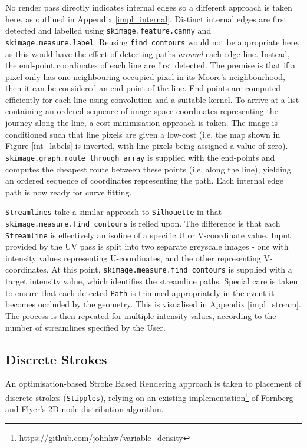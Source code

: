 {No render pass directly indicates internal edges so a different approach is taken here, as outlined in Appendix \ref{impl_internal}.
Distinct internal edges are first detected and labelled using \texttt{skimage.feature.canny} and \texttt{skimage.measure.label}. Reusing \texttt{find\_contours} would not be appropriate here, as this would have the effect of detecting paths \emph{around} each edge line.
Instead, the end-point coordinates of each line are first detected.
The premise is that if a pixel only has one neighbouring occupied pixel in its Moore's neighbourhood, then it can be considered an end-point of the line.
End-points are computed efficiently for each line using convolution and a suitable kernel.
To arrive at a list containing an ordered sequence of image-space coordinates representing the journey along the line, a cost-minimisation approach is taken.
The image is conditioned such that line pixels are given a low-cost (i.e. the map shown in Figure \ref{int_labels} is inverted, with line pixels being assigned a value of zero).
\texttt{skimage.graph.route\_through\_array} is supplied with the end-points and computes the cheapest route between these points (i.e. along the line), yielding an ordered sequence of coordinates representing the path.
Each internal edge path is now ready for curve fitting.

\texttt{Streamlines} take a similar approach to \texttt{Silhouette} in that \texttt{skimage.measure.find\_contours} is relied upon.
The difference is that each \texttt{Streamline} is effectively an isoline of a specific U or V-coordinate value.
Input provided by the UV pass is split into two separate greyscale images - one with intensity values representing U-coordinates, and the other representing V-coordinates.
At this point, \texttt{skimage.measure.find\_contours} is supplied with a target intensity value, which identifies the streamline paths.
Special care is taken to ensure that each detected \texttt{Path} is trimmed appropriately in the event it becomes occluded by the geometry.
This is visualised in Appendix \ref{impl_stream}.
The process is then repeated for multiple intensity values, according to the number of streamlines specified by the User.

\subsection{Discrete Strokes}

An optimisation-based Stroke Based Rendering approach is taken to placement of discrete strokes (\texttt{Stipples}), relying on an existing implementation\footnote{\url{https://github.com/johnhw/variable_density}} of Fornberg and Flyer's \citep{fornberg2015} 2D node-distribution algorithm.

}
